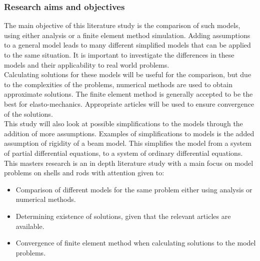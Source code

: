 \documentclass[../../main.tex]{subfiles}
\begin{document}
\subsubsection*{Research aims and objectives}
The main objective of this literature study is the comparison of such models, using either analysis or a finite element method simulation. Adding assumptions to a general model leads to many different simplified models that can be applied to the same situation. It is important to investigate the differences in these models and their applicability to real world problems.\\

Calculating solutions for these models will be useful for the comparison, but due to the complexities of the problems, numerical methods are used to obtain approximate solutions. The finite element method is generally accepted to be the best for elasto-mechanics. Appropriate articles will be used to ensure convergence of the solutions.\\

This study will also look at possible simplifications to the models through the addition of more assumptions. Examples of simplifications to models is the added assumption of rigidity of a beam model. This simplifies the model from a system of partial differential equations, to a system of ordinary differential equations.\\

This masters research is an in depth literature study with a main focus on model problems on shells and rods with attention given to:
\begin{itemize}
 \item Comparison of different models for the same problem either using analysis or numerical methods.
 \item Determining existence of solutions, given that the relevant articles are available.
 \item Convergence of finite element method when calculating solutions to the model problems.
\end{itemize}
\end{document}
